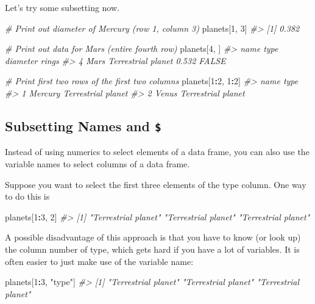 \documentclass[]{book}
\newenvironment{Shaded}{\begin{snugshade}}{\end{snugshade}}
\newcommand{\DecValTok}[1]{\textcolor[rgb]{0.00,0.00,0.81}{#1}}
\newcommand{\StringTok}[1]{\textcolor[rgb]{0.31,0.60,0.02}{#1}}
\newcommand{\CommentTok}[1]{\textcolor[rgb]{0.56,0.35,0.01}{\textit{#1}}}
\newcommand{\OperatorTok}[1]{\textcolor[rgb]{0.81,0.36,0.00}{\textbf{#1}}}
\newcommand{\NormalTok}[1]{#1}
\begin{document}
Let's try some subsetting now.

\begin{Shaded}
\begin{Highlighting}[]
\CommentTok{# Print out diameter of Mercury (row 1, column 3)}
\NormalTok{planets[}\DecValTok{1}\NormalTok{, }\DecValTok{3}\NormalTok{]}
\CommentTok{#> [1] 0.382}

\CommentTok{# Print out data for Mars (entire fourth row)}
\NormalTok{planets[}\DecValTok{4}\NormalTok{, ]}
\CommentTok{#>   name               type diameter rings}
\CommentTok{#> 4 Mars Terrestrial planet    0.532 FALSE}

\CommentTok{# Print first two rows of the first two columns}
\NormalTok{planets[}\DecValTok{1}\OperatorTok{:}\DecValTok{2}\NormalTok{, }\DecValTok{1}\OperatorTok{:}\DecValTok{2}\NormalTok{]}
\CommentTok{#>      name               type}
\CommentTok{#> 1 Mercury Terrestrial planet}
\CommentTok{#> 2   Venus Terrestrial planet}
\end{Highlighting}
\end{Shaded}

\subsection{\texorpdfstring{Subsetting Names and
\texttt{\$}}{Subsetting Names and \$}}\label{subsetting-names-and}

Instead of using numerics to select elements of a data frame, you can
also use the variable names to select columns of a data frame.

Suppose you want to select the first three elements of the type column.
One way to do this is

\begin{Shaded}
\begin{Highlighting}[]
\NormalTok{planets[}\DecValTok{1}\OperatorTok{:}\DecValTok{3}\NormalTok{, }\DecValTok{2}\NormalTok{]}
\CommentTok{#> [1] "Terrestrial planet" "Terrestrial planet" "Terrestrial planet"}
\end{Highlighting}
\end{Shaded}

A possible disadvantage of this approach is that you have to know (or
look up) the column number of type, which gets hard if you have a lot of
variables. It is often easier to just make use of the variable name:

\begin{Shaded}
\begin{Highlighting}[]
\NormalTok{planets[}\DecValTok{1}\OperatorTok{:}\DecValTok{3}\NormalTok{, }\StringTok{"type"}\NormalTok{]}
\CommentTok{#> [1] "Terrestrial planet" "Terrestrial planet" "Terrestrial planet"}
\end{Highlighting}
\end{Shaded}
\end{document}
